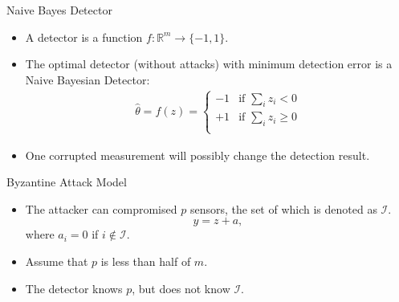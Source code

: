 \documentclass[10pt]{beamer}
\newlength\figureheight
\newlength\figurewidth
\newcommand{\tikzdir}[1]{#1.tikz}
\newcommand{\inputtikz}[1]{}}
\begin{document}
\begin{frame}{Naive Bayes Detector}
  \begin{itemize}
    \item A detector is a function $f:\mathbb R^m\rightarrow \{-1,1\}$.
    \item The optimal detector (without attacks) with minimum detection error is a Naive Bayesian Detector:
      \begin{align*}
	\hat \theta=f(z)=\begin{cases}
	  -1 &\text{if }\sum_{i}z_i < 0\\
	  +1 &\text{if }\sum_{i}z_i \geq 0\\
	\end{cases}
      \end{align*}
    \item One corrupted measurement will possibly change the detection result. 
  \end{itemize}
\end{frame}

\begin{frame}{Byzantine Attack Model}
  \begin{itemize}
  \item The attacker can compromised $p$ sensors, the set of which is denoted as $\mathcal I$. 
    \begin{displaymath}
      y = z + a,  
    \end{displaymath}
    where $a_i = 0$ if $i\notin \mathcal I$.
    \begin{center}
      \setlength{\figureheight}{2cm}
      \setlength{\figurewidth}{10cm}
      \inputtikz{blockdiagram}
    \end{center}
  \item Assume that $p$ is less than half of $m$.
  \item The detector knows $p$, but does not know $\mathcal I$.
  \end{itemize}
\end{frame}
%
%
\end{document}
